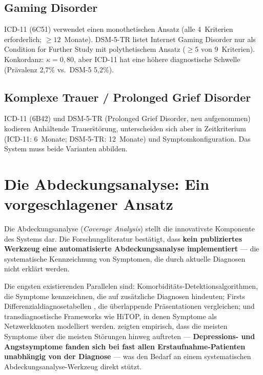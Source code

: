 \documentclass[11pt,a4paper]{article}
\begin{document}
\subsection{Gaming Disorder}

ICD-11 (6C51) verwendet einen monothetischen Ansatz (alle 4~Kriterien erforderlich; $\geq 12$~Monate). DSM-5-TR listet Internet Gaming Disorder nur als \glqq Condition for Further Study\grqq{} mit polythetischem Ansatz ($\geq 5$ von 9~Kriterien). Konkordanz: $\kappa = 0{,}80$, aber ICD-11 hat eine h\"ohere diagnostische Schwelle (Pr\"avalenz 2,7\% vs.\ DSM-5 5,2\%).

\subsection{Komplexe Trauer / Prolonged Grief Disorder}

ICD-11 (6B42) und DSM-5-TR (Prolonged Grief Disorder, neu aufgenommen) kodieren Anh\"altende Trauer\"st\"orung, unterscheiden sich aber in Zeitkriterium (ICD-11: 6~Monate; DSM-5-TR: 12~Monate) und Symptomkonfiguration. Das System muss beide Varianten abbilden.


\section{Die Abdeckungsanalyse: Ein vorgeschlagener Ansatz}
\label{sec:abdeckung}

Die Abdeckungsanalyse (\textit{Coverage Analysis}) stellt die innovativste Komponente des Systems dar. Die Forschungsliteratur best\"atigt, dass \textbf{kein publiziertes Werkzeug eine automatisierte Abdeckungsanalyse implementiert} --- die systematische Kennzeichnung von Symptomen, die durch aktuelle Diagnosen nicht erkl\"art werden.

Die engsten existierenden Parallelen sind: Komorbidit\"ats-Detektionsalgorithmen, die Symptome kennzeichnen, die auf zus\"atzliche Diagnosen hindeuten; Firsts Differenzialdiagnosetabellen \citep{First2024Handbook}, die \"uberlappende Pr\"asentationen vergleichen; und transdiagnostische Frameworks wie HiTOP, in denen Symptome als Netzwerkknoten modelliert werden. \citet{Nordgaard2020Transdiagnostic} zeigten empirisch, dass die meisten Symptome \"uber die meisten St\"orungen hinweg auftreten --- \textbf{Depressions- und Angstsymptome fanden sich bei fast allen Erstaufnahme-Patienten unabh\"angig von der Diagnose} --- was den Bedarf an einem systematischen Abdeckungsanalyse-Werkzeug direkt st\"utzt.
\end{document}
